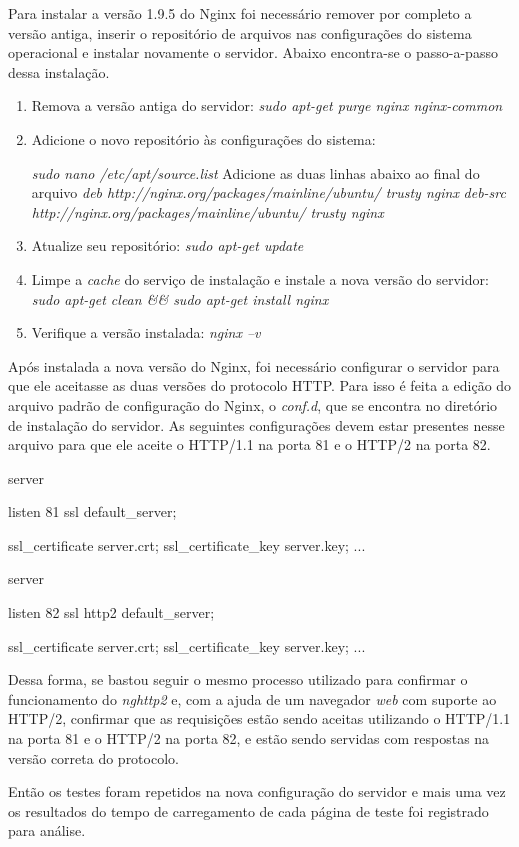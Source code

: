 Para instalar a versão 1.9.5 do Nginx foi necessário remover por completo a versão antiga, inserir o repositório de arquivos nas configurações do sistema operacional e instalar novamente o servidor. Abaixo encontra-se o passo-a-passo dessa instalação.

\begin{enumerate}
	\item Remova a versão antiga do servidor: \textit{sudo apt-get purge nginx nginx-common}
	\item Adicione o novo repositório às configurações do sistema:
		\begin{center}
			\textit{sudo nano /etc/apt/source.list}
			Adicione as duas linhas abaixo ao final do arquivo
			\textit{deb http://nginx.org/packages/mainline/ubuntu/ trusty nginx}
			\textit{deb-src http://nginx.org/packages/mainline/ubuntu/ trusty nginx}
		\end{center}
	\item Atualize seu repositório: \textit{sudo apt-get update}
	\item Limpe a \textit{cache} do serviço de instalação e instale a nova versão do servidor: \textit{sudo apt-get clean \&\& sudo apt-get install nginx}
	\item Verifique a versão instalada: \textit{nginx --v}
\end{enumerate}

Após instalada a nova versão do Nginx, foi necessário configurar o servidor para que ele aceitasse as duas versões do protocolo HTTP. Para isso é feita a edição do arquivo padrão de configuração do Nginx, o \textit{conf.d}, que se encontra no diretório de instalação do servidor. As seguintes configurações devem estar presentes nesse arquivo para que ele aceite o HTTP/1.1 na porta 81 e o HTTP/2 na porta 82.

\begin{center}
server {
    listen 81 ssl default\_server;

    ssl\_certificate    server.crt;
    ssl\_certificate\_key server.key;
    ...
}

server {
    listen 82 ssl http2 default\_server;

    ssl\_certificate    server.crt;
    ssl\_certificate\_key server.key;
    ...
}
\end{center}

Dessa forma, se bastou seguir o mesmo processo utilizado para confirmar o funcionamento do \textit{nghttp2} e, com a ajuda de um navegador \textit{web} com suporte ao HTTP/2, confirmar que as requisições estão sendo aceitas utilizando o HTTP/1.1 na porta 81 e o HTTP/2 na porta 82, e estão sendo servidas com respostas na versão correta do protocolo.

Então os testes foram repetidos na nova configuração do servidor e mais uma vez os resultados do tempo de carregamento de cada página de teste foi registrado para análise.